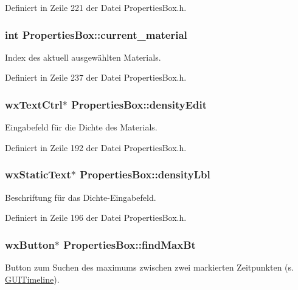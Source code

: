 Definiert in Zeile 221 der Datei Properties\-Box.\-h.

\hypertarget{classPropertiesBox_a83244ddd61bfd31452a3a975b107becb}{
\subsubsection[{current\-\_\-material}]{\setlength{\rightskip}{0pt plus 5cm}int Properties\-Box\-::current\-\_\-material\hspace{0.3cm}{\ttfamily [private]}}}\label{classPropertiesBox_a83244ddd61bfd31452a3a975b107becb}
Index des aktuell ausgewählten Materials. 

Definiert in Zeile 237 der Datei Properties\-Box.\-h.

\hypertarget{classPropertiesBox_a0c71f6f0ea002a57ac0750e8ae9cdf13}{
\subsubsection[{density\-Edit}]{\setlength{\rightskip}{0pt plus 5cm}wx\-Text\-Ctrl$\ast$ Properties\-Box\-::density\-Edit\hspace{0.3cm}{\ttfamily [private]}}}\label{classPropertiesBox_a0c71f6f0ea002a57ac0750e8ae9cdf13}
Eingabefeld für die Dichte des Materials. 

Definiert in Zeile 192 der Datei Properties\-Box.\-h.

\hypertarget{classPropertiesBox_a1c670a16a13cb03338867a35508f7f5a}{
\subsubsection[{density\-Lbl}]{\setlength{\rightskip}{0pt plus 5cm}wx\-Static\-Text$\ast$ Properties\-Box\-::density\-Lbl\hspace{0.3cm}{\ttfamily [private]}}}\label{classPropertiesBox_a1c670a16a13cb03338867a35508f7f5a}
Beschriftung für das Dichte-\/\-Eingabefeld. 

Definiert in Zeile 196 der Datei Properties\-Box.\-h.

\hypertarget{classPropertiesBox_af03e4a7248c0cb91f3978eadc0936c61}{
\subsubsection[{find\-Max\-Bt}]{\setlength{\rightskip}{0pt plus 5cm}wx\-Button$\ast$ Properties\-Box\-::find\-Max\-Bt\hspace{0.3cm}{\ttfamily [private]}}}\label{classPropertiesBox_af03e4a7248c0cb91f3978eadc0936c61}
Button zum Suchen des maximums zwischen zwei markierten Zeitpunkten (s. \hyperlink{classGUITimeline}{G\-U\-I\-Timeline}). 

